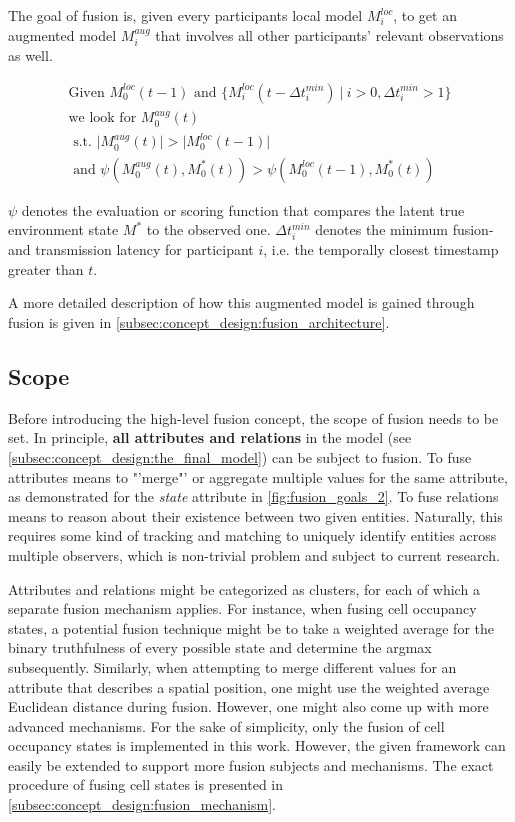The goal of fusion is, given every participants local model $M^{loc}_i$, to get an augmented model $M^{aug}_i$ that involves all other participants' relevant observations as well.

\begin{gather*}
	\text{Given\ } M^{loc}_0(t-1) \text{\ and\ } \{M^{loc}_i(t - \Delta t^{min}_i)\ |\ i > 0, \Delta t^{min}_i > 1\} \\
	\text{we look for\ } M^{aug}_0(t) \\ 
	\text{\ s.t.\ } \bigl|  M^{aug}_0(t) \bigl| > \bigl| M^{loc}_0(t-1) \bigl| \\
	\text{\ and\ } \psi(M^{aug}_0(t), M^{*}_0(t)) > \psi(M^{loc}_0(t-1), M^{*}_0(t))
\end{gather*}

$\psi$ denotes the evaluation or scoring function that compares the latent true environment state $M^*$ to the observed one. $\Delta t^{min}_i$ denotes the minimum fusion- and transmission latency for participant $i$, i.e. the temporally closest timestamp greater than $t$. 

A more detailed description of how this augmented model is gained through fusion is given in \cref{subsec:concept_design:fusion_architecture}.

\subsection{Scope}
\label{subsec:concept_design:scope}
Before introducing the high-level fusion concept, the scope of fusion needs to be set. In principle, \textbf{all attributes and relations} in the model (see \cref{subsec:concept_design:the_final_model}) can be subject to fusion. To fuse attributes means to "'merge"' or aggregate multiple values for the same attribute, as demonstrated for the \textit{state} attribute in \cref{fig:fusion_goals_2}. To fuse relations means to reason about their existence between two given entities. Naturally, this requires some kind of tracking and matching to uniquely identify entities across multiple observers, which is non-trivial problem and subject to current research.

Attributes and relations might be categorized as clusters, for each of which a separate fusion mechanism applies. For instance, when fusing cell occupancy states, a potential fusion technique might be to take a weighted average for the binary truthfulness of every possible state and determine the argmax subsequently. Similarly, when attempting to merge different values for an attribute that describes a spatial position, one might use the weighted average Euclidean distance during fusion. However, one might also come up with more advanced mechanisms. For the sake of simplicity, only the fusion of cell occupancy states is implemented in this work. However, the given framework can easily be extended to support more fusion subjects and mechanisms. The exact procedure of fusing cell states is presented in \cref{subsec:concept_design:fusion_mechanism}.

